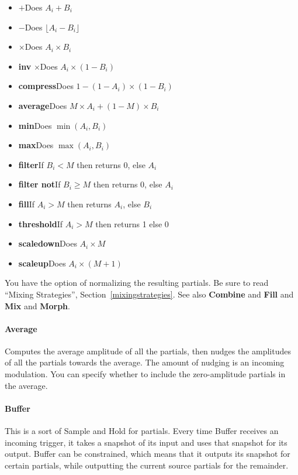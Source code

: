 \documentclass{article}
\begin{document}
\begin{itemize}
\item \(\boldsymbol{+}\)\quad Does \(A_i + B_i\)
\item \(\boldsymbol -\)\quad Does \(\lfloor A_i - B_i\rfloor\)
\item \(\boldsymbol \times\)\quad Does \(A_i \times B_i\)
\item {\bf inv} \(\boldsymbol \times\)\quad Does \(A_i \times (1 - B_i)\)
\item {\bf compress}\quad Does \(1 - (1 - A_i) \times (1 - B_i)\)
\item {\bf average}\quad Does \(M \times A_i + (1 - M) \times B_i\)
\item {\bf min}\quad Does \(\min(A_i, B_i)\)
\item {\bf max}\quad Does \(\max(A_i, B_i)\)
\item {\bf filter}\quad If \(B_i < M\) then returns 0, else \(A_i\)
\item {\bf filter not}\quad  If \(B_i \geq M\) then returns 0, else \(A_i\)
\item {\bf fill}\quad If \(A_i > M\) then returns \(A_i\), else \(B_i\)
\item {\bf threshold}\quad If \(A_i > M\) then returns 1 else 0
\item {\bf scaledown}\quad Does \(A_i \times M\)
\item {\bf scaleup}\quad Does \(A_i \times (M + 1)\)
\end{itemize}

You have the option of normalizing the resulting partials.   Be sure to read ``Mixing Strategies'', Section~\ref{mixingstrategies}.  See also {\bf Combine} and {\bf Fill} and {\bf Mix} and {\bf Morph}.

\paragraph{Average}  Computes the average amplitude of all the partials, then nudges the amplitudes of all the partials towards the average.  The amount of nudging is an incoming modulation.  You can specify whether to include the zero-amplitude partials in the average.

\paragraph{Buffer}  This is a sort of Sample and Hold for partials.  Every time Buffer receives an incoming trigger, it takes a snapshot of its input and uses that snapshot for its output.  Buffer can be constrained, which means that it outputs its snapshot for certain partials, while outputting the current source partials for the remainder.
\end{document}
